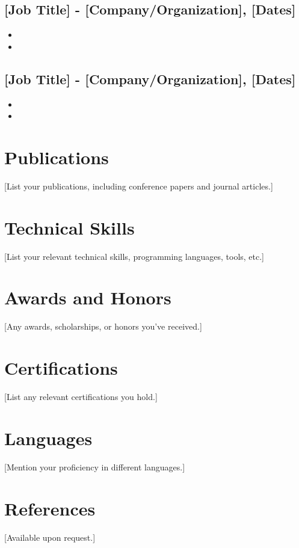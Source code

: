 \documentclass[font size, paper size, etc.]{article}
\begin{document}
\subsection{[Job Title] - [Company/Organization], [Dates]}
\label{sec:orgaa672b2}
\begin{itemize}
\item{}
\item{}
\end{itemize}

\subsection{[Job Title] - [Company/Organization], [Dates]}
\label{sec:org9c79970}
\begin{itemize}
\item{}
\item{}
\end{itemize}

\section{Publications}
\label{sec:orgf2a2f08}
[List your publications, including conference papers and journal articles.]

\section{Technical Skills}
\label{sec:orge5c998a}
[List your relevant technical skills, programming languages, tools, etc.]

\section{Awards and Honors}
\label{sec:org0421beb}
[Any awards, scholarships, or honors you've received.]

\section{Certifications}
\label{sec:org09546c4}
[List any relevant certifications you hold.]

\section{Languages}
\label{sec:org1d7d850}
[Mention your proficiency in different languages.]

\section{References}
\label{sec:org96697f2}
[Available upon request.]
\end{document}
